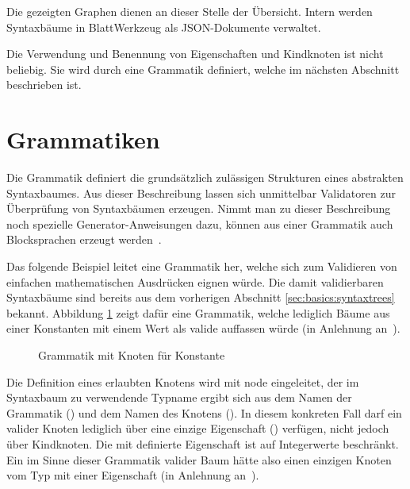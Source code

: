 Die gezeigten Graphen dienen an dieser Stelle der Übersicht. Intern werden Syntaxbäume in BlattWerkzeug als JSON-Dokumente verwaltet.

Die Verwendung und Benennung von Eigenschaften und Kindknoten ist nicht beliebig. Sie wird durch eine Grammatik definiert, welche im nächsten Abschnitt beschrieben ist.

\section{Grammatiken}
\label{sec:basics:grammars}

Die Grammatik definiert die grundsätzlich zulässigen Strukturen eines abstrakten Syntaxbaumes. Aus dieser Beschreibung lassen sich unmittelbar Validatoren zur Überprüfung von Syntaxbäumen erzeugen. Nimmt man zu dieser Beschreibung noch spezielle Ge\-ne\-ra\-tor-An\-wei\-sung\-en dazu, können aus einer Grammatik auch Blocksprachen erzeugt werden~\cite[3]{riemer2018}.

Das folgende Beispiel leitet eine Grammatik her, welche sich zum Validieren von einfachen mathematischen Ausdrücken eignen würde. Die damit validierbaren Syntaxbäume sind bereits aus dem vorherigen Abschnitt \ref{sec:basics:syntaxtrees} bekannt. Abbildung \ref{fig:basics:grammars:1} zeigt dafür eine Grammatik, welche lediglich Bäume aus einer Konstanten mit einem Wert als valide auffassen würde (in Anlehnung an~\cite[6]{riemer2018}).

\begin{figure}[h]
  
  \caption{Grammatik mit Knoten für Konstante}
  \label{fig:basics:grammars:1}
\end{figure}

Die Definition eines erlaubten Knotens wird mit node eingeleitet, der im Syntaxbaum zu verwendende Typname ergibt sich aus dem Namen der Grammatik () und dem Namen des Knotens (). In diesem konkreten Fall darf ein valider Knoten lediglich über eine einzige Eigenschaft ()  verfügen, nicht jedoch über Kindknoten. Die mit  definierte Eigenschaft ist auf Integerwerte beschränkt. Ein im Sinne dieser Grammatik valider Baum hätte also einen einzigen Knoten vom Typ  mit einer Eigenschaft  (in Anlehnung an~\cite[6]{riemer2018}).

